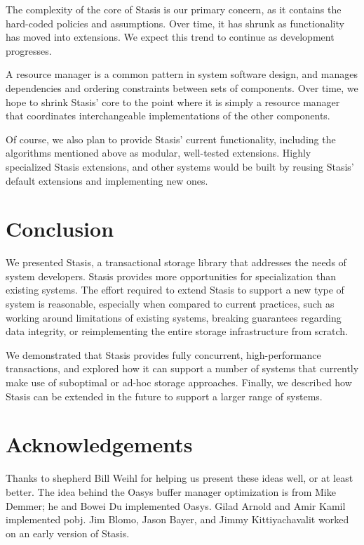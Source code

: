 \documentclass[letterpaper,twocolumn,10pt]{article}
\newcommand{\yad}{Stasis\xspace}
\newcommand{\yads}{Stasis'\xspace}
\newcommand{\oasys}{Oasys\xspace}
\begin{document}
The complexity of the core of \yad is our primary concern, as it
contains the hard-coded policies and assumptions.  Over time, it has
shrunk as functionality has moved into extensions.  We expect
this trend to continue as development progresses.  

A resource manager is a common pattern in system software design, and
manages dependencies and ordering constraints between sets of
components.  Over time, we hope to shrink \yads core to the point
where it is simply a resource manager that coordinates interchangeable
implementations of the other components.

Of course, we also plan to provide \yads current functionality, including the algorithms
mentioned above as modular, well-tested extensions.
Highly specialized \yad extensions, and other systems would be built
by reusing \yads default extensions and implementing new ones.


\section{Conclusion}

We presented \yad, a transactional storage library that addresses
the needs of system developers.  \yad provides more opportunities for
specialization than existing systems.  The effort required to extend
\yad to support a new type of system is reasonable, especially when
compared to current practices, such as working around
limitations of existing systems, breaking guarantees regarding data
integrity, or reimplementing the entire storage infrastructure from
scratch.

We demonstrated that \yad provides fully
concurrent, high-performance transactions, and explored how it can
support a number of systems that currently make use of suboptimal or
ad-hoc storage approaches.  Finally, we described how \yad can be
extended in the future to support a larger range of systems.



\section{Acknowledgements}

Thanks to shepherd Bill Weihl for helping us present these ideas well,
or at least better. The idea behind the \oasys buffer manager
optimization is from Mike Demmer; he and Bowei Du implemented \oasys.
Gilad Arnold and Amir Kamil implemented
 pobj.  Jim Blomo, Jason Bayer, and Jimmy
Kittiyachavalit worked on an early version of \yad.
\end{document}
